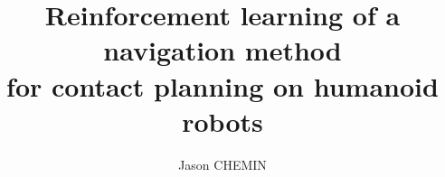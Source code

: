 %
%
%
% 
%

\usepackage[ED=EDSYS-Robo, Ets=INSA]{tlsflyleaf}
\title{\textbf{\large Reinforcement learning of a navigation method \\for contact planning on humanoid robots}}
\author{Jason CHEMIN}

